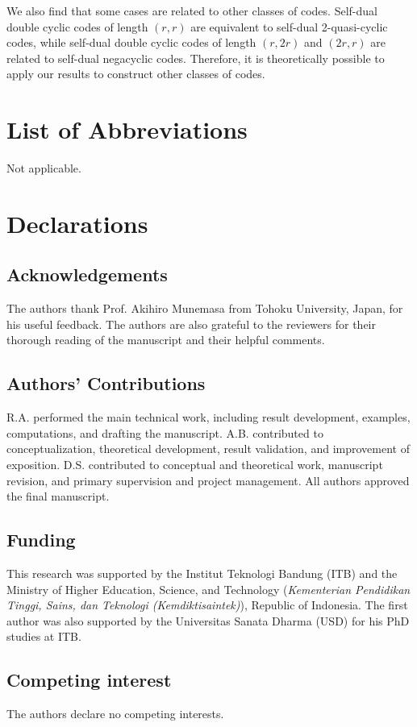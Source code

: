 \documentclass[12pt]{article}
\begin{document}
	We also find that some cases are related to other classes of codes. Self-dual double cyclic codes of length $(r,r)$ are equivalent to self-dual 2-quasi-cyclic codes, while self-dual double cyclic codes of length $(r,2r)$ and $(2r,r)$ are related to self-dual negacyclic codes. Therefore, it is theoretically possible to apply our results to construct other classes of codes.
	
	\section*{List of Abbreviations}
	Not applicable.
	
	\section*{Declarations}
	\subsection*{Acknowledgements}
	The authors thank Prof. Akihiro Munemasa from Tohoku University, Japan, for his useful feedback. The authors are also grateful to the reviewers for their thorough reading of the manuscript
	and their helpful comments.
	
	\subsection*{Authors' Contributions}
	R.A. performed the main technical work, including result development, examples, computations, and drafting the manuscript.
	A.B. contributed to conceptualization, theoretical development, result validation, and improvement of exposition.
	D.S. contributed to conceptual and theoretical work, manuscript revision, and primary supervision and project management.
	All authors approved the final manuscript.
	
	\subsection*{Funding}
	This research was supported by the Institut Teknologi Bandung (ITB) and the Ministry of Higher Education, Science, and Technology
	(\emph{Kementerian Pendidikan Tinggi, Sains, dan Teknologi (Kemdiktisaintek)}),
	Republic of Indonesia. The first author was also supported by the Universitas Sanata Dharma (USD) for his PhD studies at ITB. 
	
	\subsection*{Competing interest}
	The authors declare no competing interests.
	
\end{document}
